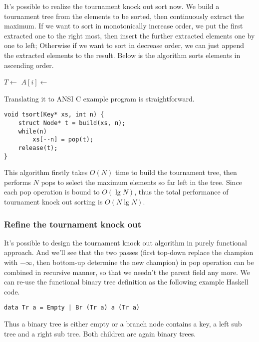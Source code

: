 \documentclass{article}
\begin{document}
It's possible to realize the tournament knock out sort now. We build a tournament tree from the elements
to be sorted, then continuously extract the maximum. If we want to sort in monotonically increase order,
we put the first extracted one to the right most, then insert the further extracted elements one by one
to left; Otherwise if we want to sort in decrease order, we can just append the extracted elements
to the result. Below is the algorithm sorts elements in ascending order.

\begin{algorithmic}
  \State $T \gets$ 
    \State $A[i] \gets$ 
  \EndFor
\EndProcedure
\end{algorithmic}

Translating it to ANSI C example program is straightforward.

\lstset{language=C}
\begin{lstlisting}
void tsort(Key* xs, int n) {
    struct Node* t = build(xs, n);
    while(n)
        xs[--n] = pop(t);
    release(t);
}
\end{lstlisting}

This algorithm firstly takes $O(N)$ time to build the tournament tree, then performs $N$ pops to select
the maximum elements so far left in the tree. Since each pop operation is bound to $O(\lg N)$, thus
the total performance of tournament knock out sorting is $O(N \lg N)$.

\subsubsection{Refine the tournament knock out}
It's possible to design the tournament knock out algorithm in purely functional approach. And we'll see
that the two passes (first top-down replace the champion with $-\infty$, then bottom-up determine the
new champion) in pop operation can be combined in recursive manner, so that we needn't the parent field
any more. We can re-use the functional binary tree definition as the following example Haskell code.

\lstset{language=Haskell}
\begin{lstlisting}
data Tr a = Empty | Br (Tr a) a (Tr a)
\end{lstlisting}

Thus a binary tree is either empty or a branch node contains a key, a left sub tree and a right sub tree.
Both children are again binary trees.
\end{document}
